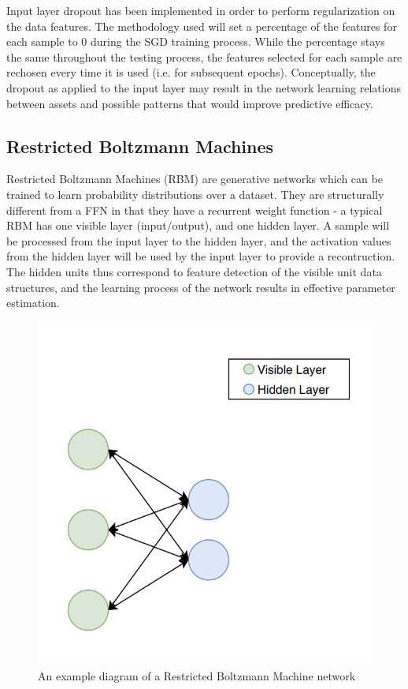 \documentclass[a4paper,11pt,oneside]{article}
\theoremstyle{plain}
\theoremstyle{definition}
\begin{document}
	Input layer dropout has been implemented in order to perform regularization on the data features. The methodology used will set a percentage of the features for each sample to 0 during the SGD training process. While the percentage stays the same throughout the testing process, the features selected for each sample are rechosen every time it is used (i.e. for subsequent epochs). Conceptually, the dropout as applied to the input layer may result in the network learning relations between assets and possible patterns that would improve predictive efficacy.
	
	\subsection{Restricted Boltzmann Machines}\label{imp_rbm}
	
	Restricted Boltzmann Machines (RBM) are generative networks which can be trained to learn probability distributions over a dataset. They are structurally different from a FFN in that they have a recurrent weight function - a typical RBM has one visible layer (input/output), and one hidden layer. A sample will be processed from the input layer to the hidden layer, and the activation values from the hidden layer will be used by the input layer to provide a recontruction. The hidden units thus correspond to feature detection of the visible unit data structures, and the learning process of the network results in effective parameter estimation. \newline
	
	\begin{figure}[H]
		\centering 
		\includegraphics[scale=0.5]{images/implementation/rbm_network_diagram.png}
		\caption[Restricted Boltzmann Machines Diagram]{An example diagram of a Restricted Boltzmann Machine network}
		\label{figure-rbm_network_diagram}
	\end{figure}		
	
\end{document}
